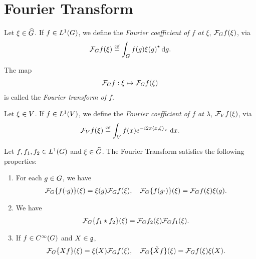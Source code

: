 \section{Fourier Transform}

\begin{definition}
    Let $\xi \in \dualGroup\Group$.
    If $f \in \Lebesgue{1}{\Group}$,
    we define the \emph{Fourier coefficient of $f$ at $\xi$}, $\Fourier f(\xi)$, via
    \begin{align*}
        \Fourier f(\xi) \defeq \int_\Group f(g) \adj{\xi(g)} \dd g.
    \end{align*}

    The map
    \begin{align*}
        \Fourier f : \xi \mapsto \Fourier f(\xi)
    \end{align*}
    is called the \emph{Fourier transform of $f$}.
\end{definition}

\begin{definition}
    Let $\xi \in \VectorSpace$.
    If $f \in \Lebesgue{1}\VectorSpace$,
    we define the \emph{Fourier coefficient of $f$ at $\lambda$}, $\Fourier[\VectorSpace] f(\xi)$, via
    \begin{align*}
        \Fourier[\VectorSpace] f(\xi) \defeq \int_\VectorSpace f(x) \e^{-\i \turn \ip{x}\xi} \dd x.
    \end{align*}
\end{definition}

\begin{proposition}
\label{proposition:elementary_properties_of_the_Fourier_transform}
    Let $f, f_1, f_2 \in \Lebesgue{1}{\Group}$ and $\xi \in \dualGroup\Group$.
    The Fourier Transform satisfies the following properties:
    \begin{enumerate}
        \item For each $g \in \Group$, we have
            \begin{align*}
                \Fourier \{f(\dummy g)\} (\xi)
                = \xi(g) \Fourier f(\xi), \quad
                \Fourier \{f(g \dummy)\} (\xi)
                = \Fourier f(\xi) \xi(g).
            \end{align*}
        \item We have
            \begin{align*}
                \Fourier \{\conv{f_1}{f_2}\}(\xi)
                = \Fourier f_2(\xi) \Fourier f_1(\xi).
            \end{align*}
        \item If $f \in \SmoothFunctions\Group$ and $X \in \LieAlgebra$,
            \begin{align*}
                \Fourier \{\LeftDifferentialOperatorFirstOrder{X} f\}(\xi)
                = \xi(X) \Fourier f(\xi), \quad
                \Fourier \{\RightDifferentialOperatorFirstOrder{X} f\}(\xi)
                = \Fourier f(\xi) \xi(X).
            \end{align*}
    \end{enumerate}
\end{proposition}


